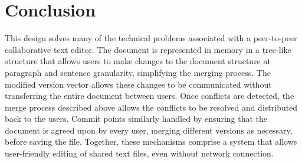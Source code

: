 \section{Conclusion}
This design solves many of the technical problems associated with a peer-to-peer
collaborative text editor. The document is represented in memory in a tree-like structure
that allows users to make changes to the document structure at paragraph and sentence
granularity, simplifying the merging process. The modified version vector allows these
changes to be communicated without transferring the entire document between users. Once
conflicts are detected, the merge process described above allows the conflicts to be
resolved and distributed back to the users. Commit points similarly handled by ensuring
that the document is agreed upon by every user, merging different versions as necessary,
before saving the file. Together, these mechanisms comprise a system that allows user-friendly
editing of shared text files, even without network connection.

